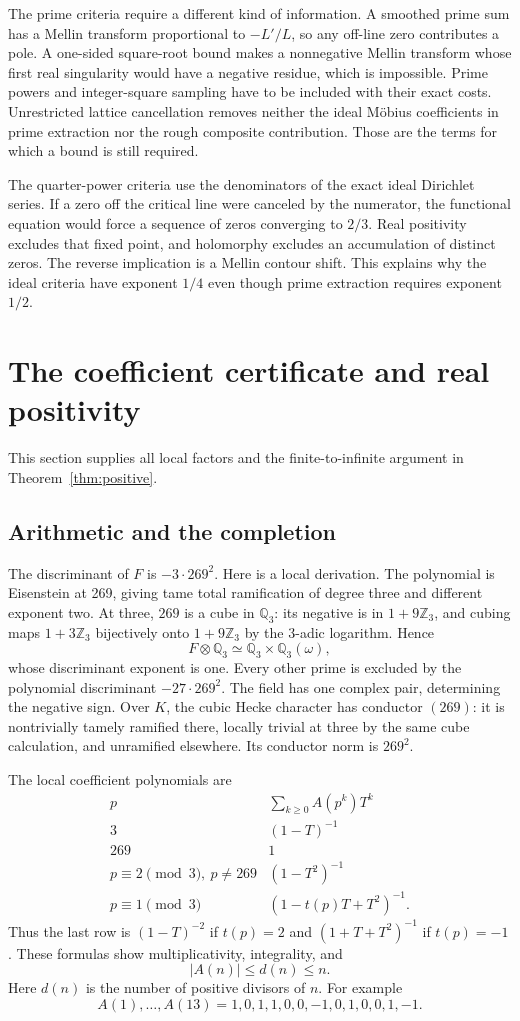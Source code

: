 \documentclass[11pt]{article}
\newcommand{\Q}{\mathbb Q}
\newcommand{\Z}{\mathbb Z}
\begin{document}
The prime criteria require a different kind of information. A smoothed prime sum has a Mellin transform proportional to $-L'/L$, so any off-line zero contributes a pole. A one-sided square-root bound makes a nonnegative Mellin transform whose first real singularity would have a negative residue, which is impossible. Prime powers and integer-square sampling have to be included with their exact costs. Unrestricted lattice cancellation removes neither the ideal M\"obius coefficients in prime extraction nor the rough composite contribution. Those are the terms for which a bound is still required.


The quarter-power criteria use the denominators of the exact ideal
Dirichlet series. If a zero off the critical line were canceled by
the numerator, the functional equation would force a sequence of
zeros converging to $2/3$. Real positivity excludes that fixed point,
and holomorphy excludes an accumulation of distinct zeros. The reverse
implication is a Mellin contour shift. This explains why the ideal
criteria have exponent $1/4$ even though prime extraction requires
exponent $1/2$.

\section{The coefficient certificate and real positivity}
This section supplies all local factors and the finite-to-infinite argument in Theorem~\ref{thm:positive}.

\subsection{Arithmetic and the completion}
The discriminant of $F$ is $-3\cdot269^2$. Here is a local derivation. The polynomial is Eisenstein at 269, giving tame total ramification of degree three and different exponent two. At three, $269$ is a cube in $\Q_3$: its negative is in $1+9\Z_3$, and cubing maps $1+3\Z_3$ bijectively onto $1+9\Z_3$ by the $3$-adic logarithm. Hence
\[
 F\otimes\Q_3\simeq\Q_3\times\Q_3(\omega),
\]
whose discriminant exponent is one. Every other prime is excluded by the polynomial discriminant $-27\cdot269^2$. The field has one complex pair, determining the negative sign. Over $K$, the cubic Hecke character has conductor $(269)$: it is nontrivially tamely ramified there, locally trivial at three by the same cube calculation, and unramified elsewhere. Its conductor norm is $269^2$.

The local coefficient polynomials are
\[
 \begin{array}{c|c}
 p&\displaystyle\sum_{k\ge0}A(p^k)T^k\\\hline
 3&(1-T)^{-1}\\
 269&1\\
 p\equiv2\pmod3,\ p\ne269&(1-T^2)^{-1}\\
 p\equiv1\pmod3&(1-t(p)T+T^2)^{-1}.
 \end{array}
 \tag{3.1}
\]
Thus the last row is $(1-T)^{-2}$ if $t(p)=2$ and $(1+T+T^2)^{-1}$ if $t(p)=-1$. These formulas show multiplicativity, integrality, and
\[
 |A(n)|\le d(n)\le n.
 \tag{3.2}
\]
Here $d(n)$ is the number of positive divisors of $n$. For example
\[
 A(1),\ldots,A(13)=1,0,1,1,0,0,-1,0,1,0,0,1,-1.
\]
\end{document}

